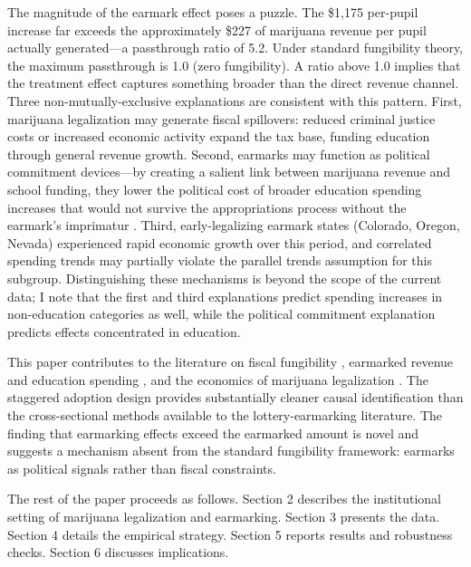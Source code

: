 \documentclass[12pt]{article}
\begin{document}
The magnitude of the earmark effect poses a puzzle. The \$1,175 per-pupil increase far exceeds the approximately \$227 of marijuana revenue per pupil actually generated---a passthrough ratio of 5.2. Under standard fungibility theory, the maximum passthrough is 1.0 (zero fungibility). A ratio above 1.0 implies that the treatment effect captures something broader than the direct revenue channel. Three non-mutually-exclusive explanations are consistent with this pattern. First, marijuana legalization may generate fiscal spillovers: reduced criminal justice costs or increased economic activity expand the tax base, funding education through general revenue growth. Second, earmarks may function as political commitment devices---by creating a salient link between marijuana revenue and school funding, they lower the political cost of broader education spending increases that would not survive the appropriations process without the earmark's imprimatur \citep{brunner2004earmarking, peltzman1992voters}. Third, early-legalizing earmark states (Colorado, Oregon, Nevada) experienced rapid economic growth over this period, and correlated spending trends may partially violate the parallel trends assumption for this subgroup. Distinguishing these mechanisms is beyond the scope of the current data; I note that the first and third explanations predict spending increases in non-education categories as well, while the political commitment explanation predicts effects concentrated in education.

This paper contributes to the literature on fiscal fungibility \citep{hines1995anomalies, gordon2004intergovernmental, dahlby2011marginal}, earmarked revenue and education spending \citep{evans2007earmarking, borg1990earmarking, spindler1991casino}, and the economics of marijuana legalization \citep{hansen2020taxation, dills2021dose, nicholas2023effects}. The staggered adoption design provides substantially cleaner causal identification than the cross-sectional methods available to the lottery-earmarking literature. The finding that earmarking effects exceed the earmarked amount is novel and suggests a mechanism absent from the standard fungibility framework: earmarks as political signals rather than fiscal constraints.

The rest of the paper proceeds as follows. Section 2 describes the institutional setting of marijuana legalization and earmarking. Section 3 presents the data. Section 4 details the empirical strategy. Section 5 reports results and robustness checks. Section 6 discusses implications.
\end{document}
